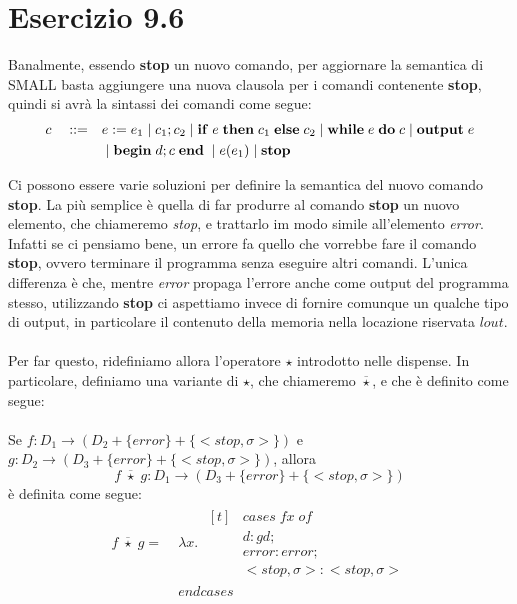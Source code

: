 \section*{Esercizio 9.6}

    
    Banalmente, essendo \textbf{stop} un nuovo comando, per aggiornare la semantica di SMALL basta aggiungere una nuova clausola per i comandi contenente \textbf{stop}, quindi si avrà la sintassi dei comandi come segue:
    \begin{align*}
        c \quad ::= \quad & e:=e_1 \;|\; c_1;c_2 \;|\; \mbox{\textbf{if}}\; e \;\mbox{\textbf{then}}\; c_1\; \mbox{\textbf{else}}\; c_2 \;|\; \mbox{\textbf{while}}\; e\; \mbox{\textbf{do}}\; c \;|\; \mbox{\textbf{output}}\; e \\
        &\;|\; \mbox{\textbf{begin}}\; d;c\; \mbox{\textbf{end}}\; \;|\; e(e_1) \;|\; \mbox{\textbf{stop}}
    \end{align*}
    
    Ci possono essere varie soluzioni per definire la semantica del nuovo comando \textbf{stop}. La più semplice è quella di far produrre al comando \textbf{stop} un nuovo elemento, che chiameremo \textit{stop}, e trattarlo im modo simile all'elemento \textit{error}. Infatti se ci pensiamo bene, un errore fa quello che vorrebbe fare il comando \textbf{stop}, ovvero terminare il programma senza eseguire altri comandi. L'unica differenza è che, mentre \textit{error} propaga l'errore anche come output del programma stesso, utilizzando \textbf{stop} ci aspettiamo invece di fornire comunque un qualche tipo di output, in particolare il contenuto della memoria nella locazione riservata $lout$.\\
    \\
    Per far questo, ridefiniamo allora l'operatore $\star$ introdotto nelle dispense. In particolare, definiamo una variante di $\star$, che chiameremo $\overline{\star}$, e che è definito come segue:\\
    \\
    Se $f : D_1 \rightarrow (D_2 + \{error\} + \{<stop, \sigma>\})$ e $g : D_2 \rightarrow (D_3 + \{error\} + \{<stop, \sigma>\})$, allora
    \begin{equation*}
        f\; \overline{\star}\; g : D_1 \rightarrow (D_3 + \{error\} + \{<stop, \sigma>\})
    \end{equation*}
    è definita come segue:
    \begin{align*}
        f\; \overline{\star}\; g =\; &\lambda x.\; \begin{aligned}[t]& cases\; fx\; of\\
            & d : gd;\\
            & error : error;\\
            & <stop, \sigma> : <stop, \sigma>
        \end{aligned}\\
        & endcases
    \end{align*}
    
